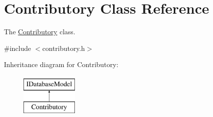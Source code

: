 \hypertarget{classContributory}{\section{Contributory Class Reference}
\label{classContributory}
}


The \hyperlink{classContributory}{Contributory} class.  




{\ttfamily \#include $<$contributory.\+h$>$}

Inheritance diagram for Contributory\+:\begin{figure}[H]
\begin{center}
\leavevmode
\includegraphics[height=2.000000cm]{d5/d09/classContributory}
\end{center}
\end{figure}
